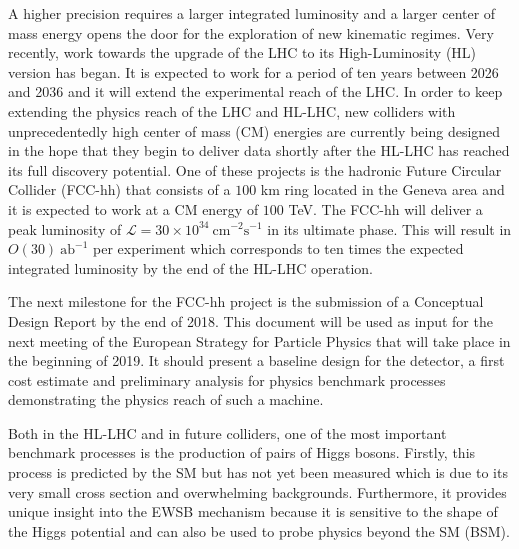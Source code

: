 A higher precision requires a larger integrated luminosity and a larger center of mass energy opens the door for the exploration of new kinematic regimes. Very recently, work towards the upgrade of the LHC to its High-Luminosity (HL) version has began. It is expected to work for a period of ten years between 2026 and 2036 and it will extend the experimental reach of the LHC. In order to keep extending the physics reach of the LHC and HL-LHC, new colliders with unprecedentedly high center of mass (CM) energies are currently being designed in the hope that they begin to deliver data shortly after the HL-LHC has reached its full discovery potential. One of these projects is the hadronic Future Circular Collider (FCC-hh) that consists of a $100$ km ring located in the Geneva area and it is expected to work at a CM energy of $100$ TeV. The FCC-hh will deliver a peak luminosity of $\mathcal{L}=30\times 10^{34}~\text{cm}^{-2}\text{s}^{-1}$ in its ultimate phase. This will result in $O(30)~\text{ab}^{-1}$ per experiment which corresponds to ten times the expected integrated luminosity by the end of the HL-LHC operation. 

The next milestone for the FCC-hh project is the submission of a Conceptual Design Report by the end of 2018. This document will be used as input for the next meeting of the European Strategy for Particle Physics that will take place in the beginning of 2019. It should present a baseline design for the detector, a first cost estimate and preliminary analysis for physics benchmark processes demonstrating the physics reach of such a machine.

Both in the HL-LHC and in future colliders, one of the most important benchmark processes is the production of pairs of Higgs bosons. Firstly, this process is predicted by the SM but has not yet been measured which is due to its very small cross section and overwhelming backgrounds. Furthermore, it provides unique insight into the EWSB mechanism because it is sensitive to the shape of the Higgs potential and can also be used to probe physics beyond the SM (BSM).

